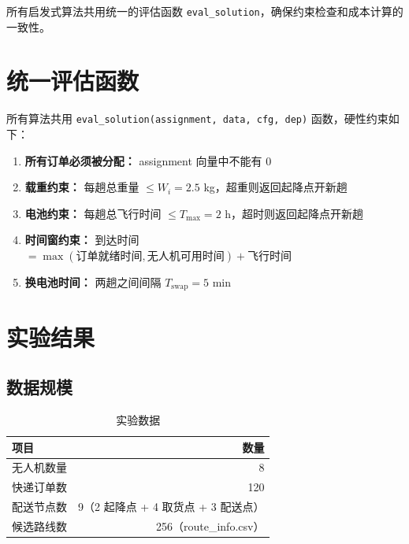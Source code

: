 \documentclass[12pt,a4paper]{article}
\begin{document}
所有启发式算法共用统一的评估函数 \texttt{eval\_solution}，确保约束检查和成本计算的一致性。

\section{统一评估函数}

所有算法共用 \texttt{eval\_solution(assignment, data, cfg, dep)} 函数，硬性约束如下：

\begin{enumerate}[leftmargin=2em]
  \item \textbf{所有订单必须被分配：} assignment 向量中不能有 0
  \item \textbf{载重约束：} 每趟总重量 $\leq W_i = 2.5$ kg，超重则返回起降点开新趟
  \item \textbf{电池约束：} 每趟总飞行时间 $\leq T_{\max} = 2$ h，超时则返回起降点开新趟
  \item \textbf{时间窗约束：} 到达时间 $= \max(\text{订单就绪时间}, \text{无人机可用时间}) + \text{飞行时间}$
  \item \textbf{换电池时间：} 两趟之间间隔 $T_{\text{swap}} = 5$ min
\end{enumerate}

\section{实验结果}

\subsection{数据规模}

\begin{table}[h]
\centering
\caption{实验数据}
\begin{tabular}{lr}
\toprule
项目 & 数量 \\
\midrule
无人机数量 & 8 \\
快递订单数 & 120 \\
配送节点数 & 9（2 起降点 + 4 取货点 + 3 配送点） \\
候选路线数 & 256（route\_info.csv） \\
\bottomrule
\end{tabular}
\end{table}
\end{document}

